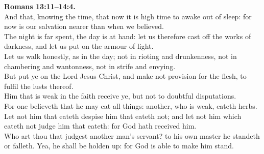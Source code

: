 \documentclass[10pt]{article} %
\begin{document}
{\begin{minipage}[t]{0.45\textwidth}
\textbf{Romans 13:11--14:4.}\\
And that, knowing the time, that now it is high time to awake out of sleep: for now is our salvation nearer than when we believed.\\
The night is far spent, the day is at hand: let us therefore cast off the works of darkness, and let us put on the armour of light.\\
Let us walk honestly, as in the day; not in rioting and drunkenness, not in chambering and wantonness, not in strife and envying.\\
But put ye on the Lord Jesus Christ, and make not provision for the flesh, to fulfil the lusts thereof.\\
Him that is weak in the faith receive ye, but not to doubtful disputations.\\
For one believeth that he may eat all things: another, who is weak, eateth herbs.\\
Let not him that eateth despise him that eateth not; and let not him which eateth not judge him that eateth: for God hath received him.\\
Who art thou that judgest another man's servant? to his own master he standeth or falleth. Yea, he shall be holden up: for God is able to make him stand.\\

\end{minipage}}
\vspace*{\fill}
\newpage
\Huge%
\vspace*{\fill}
\begin{spacing}{1.3}%
\end{spacing}
\vspace*{\fill}
\end{document}
